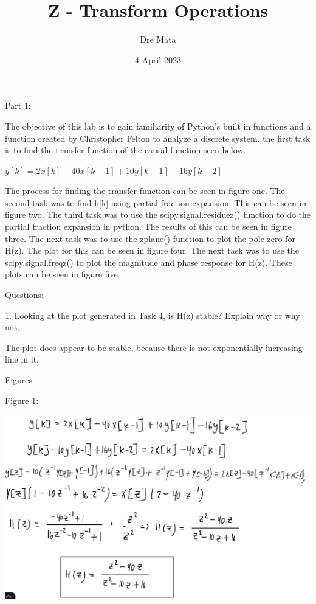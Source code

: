 \documentclass[nobib]{MSword}
\title{Z - Transform Operations}
\author{Dre Mata}
\date{4 April 2023}
\begin{document}
\maketitle
\begin{center}
    Part 1:
\end{center}
The objective of this lab is to gain familiarity of Python's built in functions and a function created by Christopher Felton to analyze a discrete system. the first task is to find the transfer function of the causal function seen below. 

\begin{center}
$ y[k] = 2x[k] - 40x[k-1] + 10y[k-1] -16y[k-2] $
\end{center}

The process for finding the transfer function can be seen in figure one. The second task was to find h[k] using partial fraction expansion. This can be seen in figure two. The third task was to use the scipy.signal.residuez() function to do the partial fraction expansion in python. The results of this can be seen in figure three. The next task was to use the zplane() function to plot the pole-zero for H(z). The plot for this can be seen in figure four. The next task was to use the scipy.signal.freqz() to plot the magnitude and phase response for H(z). These plots can be seen in figure five.

\begin{center}
    Questions:
\end{center}

1. Looking at the plot generated in Task 4, is H(z) stable? Explain why or why not.

The plot does appear to be stable, because there is not exponentially increasing line in it.

\begin{center}
    Figures
\end{center}

Figure 1:

\includegraphics[scale = 0.2]
{txt/Lab11Fig1.jpeg}
\end{document}
